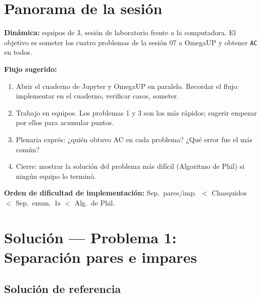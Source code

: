 \documentclass[12pt, oneside]{article}
\begin{document}

\tableofcontents
\newpage

\section{Panorama de la sesión}

\begin{notaprofesor}
  \textbf{Dinámica:} equipos de 3, sesión de laboratorio frente a la
  computadora.  El objetivo es someter los cuatro problemas de la sesión 07
  a OmegaUP y obtener \texttt{AC} en todos.

  \textbf{Flujo sugerido:}
  \begin{enumerate}
    \item[0--5 min]   Abrir el cuaderno de Jupyter y OmegaUP en paralelo.
                      Recordar el flujo: implementar en el cuaderno,
                      verificar casos, someter.
    \item[5--45 min]  Trabajo en equipos.  Los problemas 1 y 3 son los más
                      rápidos; sugerir empezar por ellos para acumular puntos.
    \item[45--55 min] Plenaria exprés: ¿quién obtuvo AC en cada problema?
                      ¿Qué error fue el más común?
    \item[55--60 min] Cierre: mostrar la solución del problema más difícil
                      (Algoritmo de Phil) si ningún equipo lo terminó.
  \end{enumerate}

  \textbf{Orden de dificultad de implementación:}
  Sep.\ pares/imp.\ $<$ Chasquidos $<$ Sep.\ enum.\ 1s $<$ Alg.\ de Phil.
\end{notaprofesor}

\newpage

\section{Solución — Problema 1: Separación pares e impares}

\subsection{Solución de referencia}
\end{document}
